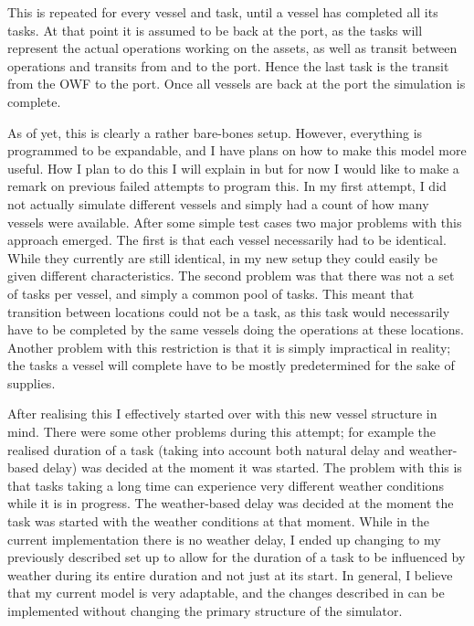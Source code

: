 \documentclass[a4paper,12pt]{article}
\begin{document}
This is repeated for every vessel and task, until a vessel has completed all its tasks. At that point it is assumed to be back at the port, as the tasks will represent the actual operations working on the assets, as well as transit between operations and transits from and to the port. Hence the last task is the transit from the OWF to the port. Once all vessels are back at the port the simulation is complete. 

\bigskip

As of yet, this is clearly a rather bare-bones setup. However, everything is programmed to be expandable, and I have plans on how to make this model more useful. How I plan to do this I will explain in  but for now I would like to make a remark on previous failed attempts to program this. In my first attempt, I did not actually simulate different vessels and simply had a count of how many vessels were available. After some simple test cases two major problems with this approach emerged. The first is that each vessel necessarily had to be identical. While they currently are still identical, in my new  setup they could easily be given different characteristics. The second problem was that there was not a set of tasks per vessel, and simply a common pool of tasks. This meant that transition between locations could not be a task, as this task would necessarily have to be completed by the same vessels doing the operations at these locations. Another problem with this restriction is that it is simply impractical in reality; the tasks a vessel will complete have to be mostly predetermined for the sake of supplies.

After realising this I effectively started over with this new vessel structure in mind. There were some other problems during this attempt; for example the realised duration of a task (taking into account both natural delay and weather-based delay) was decided at the moment it was started. The problem with this is that tasks taking a long time can experience very different weather conditions while it is in progress. The weather-based delay was decided at the moment the task was started with the weather conditions at that moment. While in the current implementation there is no weather delay, I ended up changing to my previously described set up to allow for the duration of a task to be influenced by weather during its entire duration and not just at its start. In general, I believe that my current model is very adaptable, and the changes described in  can be implemented without changing the primary structure of the simulator. 
\end{document}
